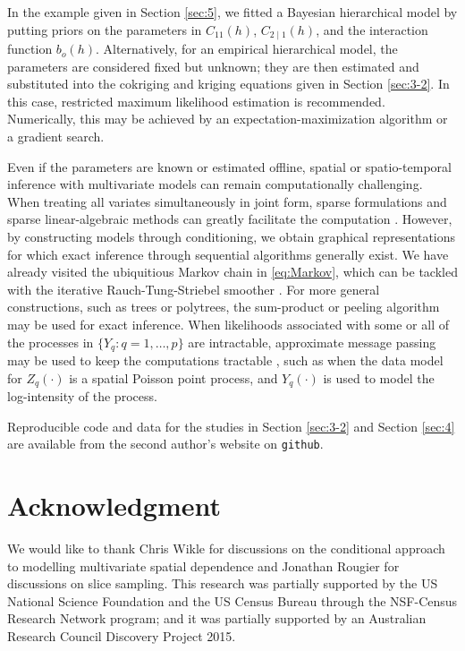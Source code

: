 \documentclass[lineno]{biometrika}
\newcommand{\h}{h}
\begin{document}
In the example given in Section \ref{sec:5}, we fitted a Bayesian hierarchical model by putting priors on the parameters in $C_{11}(\h)$, $C_{2\mid 1}(\h)$, and the interaction function $b_o(\h)$. Alternatively, for an empirical hierarchical model, the parameters are considered fixed but unknown; they are then estimated and substituted into the cokriging and kriging equations given in Section \ref{sec:3-2}. In this case, restricted maximum likelihood estimation is recommended. Numerically, this may be achieved by an expectation-maximization algorithm or a gradient search.

Even if the parameters are known or estimated offline, spatial or spatio-temporal inference with multivariate models can remain computationally challenging. When treating all variates simultaneously in joint form, sparse formulations and sparse linear-algebraic methods can greatly facilitate the computation \citep[e.g.,][]{Zammit_2015}. However, by constructing models through conditioning, we obtain graphical representations for which exact inference through sequential algorithms generally exist. We have already visited the ubiquitious Markov chain in \eqref{eq:Markov}, which can be tackled with the iterative Rauch-Tung-Striebel smoother \citep[e.g.,][]{Rauch_1965}. For more general constructions, such as trees or polytrees, the sum-product or peeling algorithm may be used for exact inference. When likelihoods associated with some or all of the processes in $\{Y_q : q = 1,\dots,p\}$  are intractable, approximate message passing may be used to keep the computations tractable \citep[e.g.,][]{Heskes_2002}, such as when the data model for $Z_q(\cdot)$ is a spatial Poisson point process, and $Y_q(\cdot)$ is used to model the log-intensity of the process.

Reproducible code and data for the studies in Section \ref{sec:3-2} and Section \ref{sec:4} are available from the second author's website on \texttt{github}. 

\section*{Acknowledgment}

We would like to thank Chris Wikle for discussions on the conditional approach to modelling multivariate spatial dependence and Jonathan Rougier for discussions on slice sampling. This research was partially supported by the US National Science Foundation and the US Census Bureau through the NSF-Census Research Network program; and it was partially supported by an Australian Research Council Discovery Project 2015.
\end{document}
